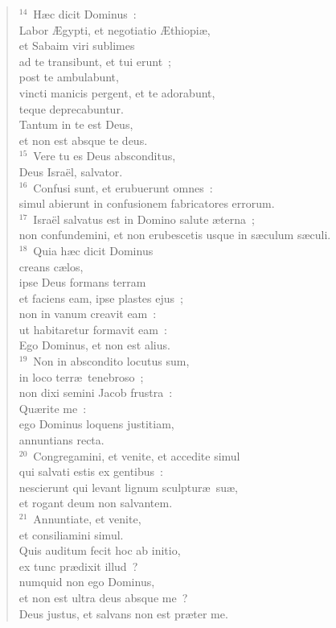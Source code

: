 \begin{flushleft}\begin{verse}${}^{14}$~H\ae c dicit Dominus~:\\ Labor \AE gypti, et negotiatio \AE thiopi\ae ,\\ et Sabaim viri sublimes\\ ad te transibunt, et tui erunt~;\\ post te ambulabunt,\\ vincti manicis pergent, et te adorabunt,\\ teque deprecabuntur.\\ Tantum in te est Deus,\\ et non est absque te deus.\\
${}^{15}$~Vere tu es Deus absconditus,\\ Deus Isra\"el, salvator.\\
${}^{16}$~Confusi sunt, et erubuerunt omnes~:\\ simul abierunt in confusionem fabricatores errorum.\\
${}^{17}$~Isra\"el salvatus est in Domino salute \ae terna~;\\ non confundemini, et non erubescetis usque in s\ae culum s\ae culi.\\
${}^{18}$~Quia h\ae c dicit Dominus\\ creans c\ae los,\\ ipse Deus formans terram\\ et faciens eam, ipse plastes ejus~;\\ non in vanum creavit eam~:\\ ut habitaretur formavit eam~:\\ Ego Dominus, et non est alius.\\
${}^{19}$~Non in abscondito locutus sum,\\ in loco terr\ae\ tenebroso~;\\ non dixi semini Jacob frustra~:\\ Qu\ae rite me~:\\ ego Dominus loquens justitiam,\\ annuntians recta.\\
${}^{20}$~Congregamini, et venite, et accedite simul\\ qui salvati estis ex gentibus~:\\ nescierunt qui levant lignum sculptur\ae\ su\ae ,\\ et rogant deum non salvantem.\\
${}^{21}$~Annuntiate, et venite,\\ et consiliamini simul.\\ Quis auditum fecit hoc ab initio,\\ ex tunc pr\ae dixit illud~?\\ numquid non ego Dominus,\\ et non est ultra deus absque me~?\\ Deus justus, et salvans non est pr\ae ter me.\\

\end{verse}
\end{flushleft}
